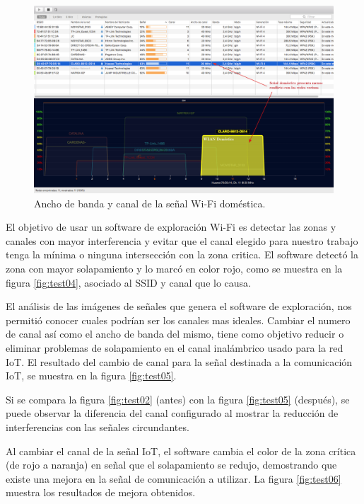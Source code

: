 \begin{landscape} %
\begin{figure}[htpb]
\centering 
\includegraphics[width=1.5\textwidth]{./Figures/wifi/03.png}
\caption{Ancho de banda  y canal de la señal Wi-Fi doméstica.}
\label{fig:test03}
\end{figure}
\end{landscape} %

El objetivo de usar un software de exploración Wi-Fi es detectar las zonas y canales con mayor interferencia y evitar que el canal elegido para nuestro trabajo tenga la mínima o ninguna intersección con la zona critica. El software detectó la zona con mayor solapamiento y lo marcó en color rojo, como se muestra en la figura \ref{fig:test04}, asociado al SSID y canal que lo causa.

El análisis de las imágenes de señales que genera el software de exploración, nos permitió conocer cuales podrían ser los canales mas ideales. Cambiar el numero de canal así como el ancho de banda del mismo, tiene como objetivo reducir o eliminar problemas de solapamiento en el canal inalámbrico usado para la red IoT. El resultado del cambio de canal para la señal destinada a la comunicación IoT, se muestra en la figura \ref{fig:test05}. 

Si se compara la figura \ref{fig:test02} (antes) con la figura \ref{fig:test05} (después), se puede observar la diferencia del canal configurado al mostrar la reducción de interferencias con las señales circundantes.

Al cambiar el canal de la señal IoT, el software cambia el color de la zona crítica (de rojo a naranja) en señal que el solapamiento se redujo, demostrando que existe una mejora en la señal de comunicación a utilizar. La figura \ref{fig:test06} muestra los resultados de mejora obtenidos.

